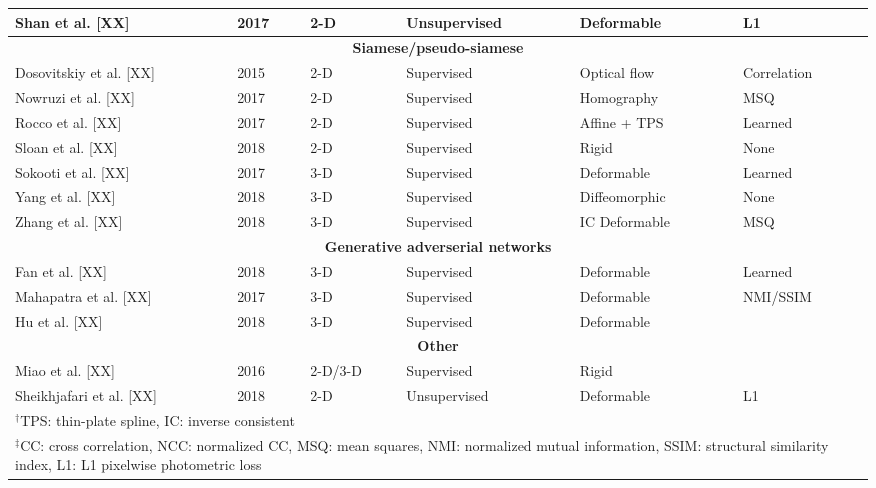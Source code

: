 \begin{table}[!htb]
\begin{tabular*}{\textwidth}{l@{\extracolsep{\fill}}l@{\extracolsep{\fill}}l@{\extracolsep{\fill}}l@{\extracolsep{\fill}}l@{\extracolsep{\fill}}l}
  Shan et al. [XX] & 2017 & 2-D & Unsupervised & Deformable & L1 \\
\midrule
\multicolumn{6}{c}{\textbf{Siamese/pseudo-siamese}}
  \vspace{0.25cm} \\
  Dosovitskiy et al. [XX] & 2015 & 2-D & Supervised & Optical flow & Correlation \\
  Nowruzi et al. [XX] & 2017 & 2-D & Supervised & Homography & MSQ \\
  Rocco et al. [XX] & 2017 & 2-D & Supervised & Affine + TPS & Learned \\
  Sloan et al. [XX] & 2018 & 2-D & Supervised & Rigid & None \\  %
  Sokooti et al. [XX] & 2017 & 3-D & Supervised & Deformable & Learned \\
  Yang et al. [XX] & 2018 & 3-D & Supervised & Diffeomorphic & None \\  %
  Zhang et al. [XX] & 2018 & 3-D & Supervised & IC Deformable & MSQ \\
\midrule
\multicolumn{6}{c}{\textbf{Generative adverserial networks}}
  \vspace{0.25cm} \\
  Fan et al. [XX] & 2018 & 3-D & Supervised & Deformable & Learned \\
  Mahapatra et al. [XX] & 2017 & 3-D & Supervised & Deformable & NMI/SSIM \\
  Hu et al. [XX] & 2018 & 3-D & Supervised & Deformable & {} \\
\midrule
\multicolumn{6}{c}{\textbf{Other}}
  \vspace{0.25cm} \\
  Miao et al. [XX] & 2016 & 2-D/3-D & Supervised & Rigid & {} \\
  Sheikhjafari et al. [XX] & 2018 & 2-D & Unsupervised & Deformable & L1 \\
\bottomrule
\multicolumn{6}{l}{
  \begin{minipage}[t]{0.9\columnwidth}%
    \footnotesize{$^\dagger$TPS: thin-plate spline, IC: inverse consistent}
  \end{minipage}
  } \\
\multicolumn{6}{l}{
  \begin{minipage}[t]{0.9\columnwidth}%
    \footnotesize{$^\ddagger$CC: cross correlation, NCC: normalized CC, MSQ: mean squares,
      NMI:  normalized mutual information, SSIM:  structural similarity index,
      L1:  L1 pixelwise photometric loss}
  \end{minipage}
  }
\end{tabular*}
\end{table}


